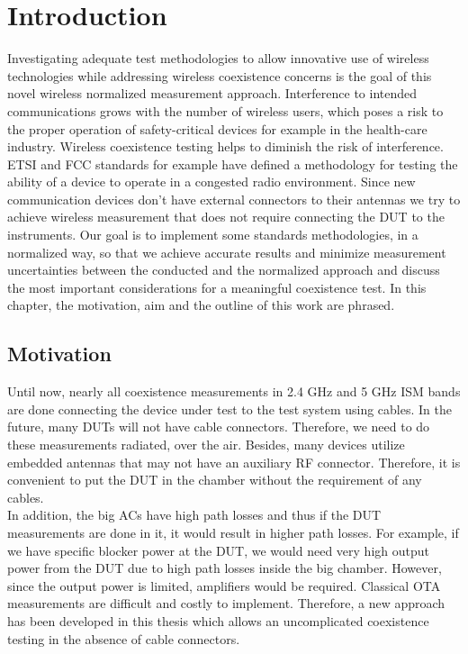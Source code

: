 \chapter{Introduction}
Investigating adequate test methodologies to allow innovative use of wireless technologies while addressing wireless coexistence concerns is the goal of this novel wireless normalized measurement approach. Interference to intended communications grows with the number of wireless users, which poses a risk to the proper operation of safety-critical devices for example in the health-care industry. Wireless coexistence testing helps to diminish the risk of interference. \acs{ETSI} and \acs{FCC} standards for example have defined a methodology for testing the ability of a device to operate in a congested radio environment. Since new communication devices don't have external connectors to their antennas we try to achieve wireless measurement that does not require connecting the \acs{DUT} to the instruments. Our goal is to implement some standards methodologies, in a normalized way, so that we achieve accurate results and minimize measurement uncertainties between the conducted and the normalized approach and discuss the most important considerations for a meaningful coexistence test. In this chapter, the motivation, aim and the outline of this work are phrased.

\section{Motivation}
Until now, nearly all coexistence measurements in 2.4 GHz and 5 GHz \ac{ISM}  bands are done connecting the device under test to the test system using cables. In the future, many \acsp{DUT} will not have cable connectors. Therefore, we need to do these measurements radiated, over the air. Besides, many devices utilize embedded antennas that may not have an auxiliary \acs{RF} connector. Therefore, it is convenient to put the \acs{DUT} in the chamber without the requirement of any cables. \\

In addition, the big  \acp{AC} have high path losses and thus if the \acs{DUT} measurements are done in it, it would result in higher path losses. For example, if we have specific blocker power at the \acs{DUT}, we would need very high output power from the \acs{DUT} due to high path losses inside the big chamber. However, since the output power is limited, amplifiers would be required. Classical \ac{OTA} measurements are difficult and costly to implement. Therefore, a new approach has been developed in this thesis which allows an uncomplicated coexistence testing in the absence of cable connectors. 


